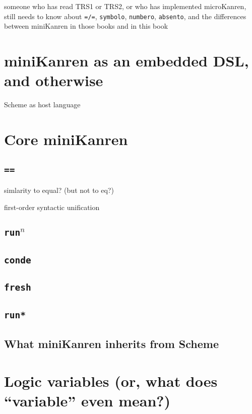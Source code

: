 \documentclass{book}
\begin{document}
someone who has read TRS1 or TRS2, or who has implemented microKanren,
still needs to know about \texttt{=/=}, \texttt{symbolo},
\texttt{numbero}, \texttt{absento}, and the differences between
miniKanren in those books and in this book

\section{miniKanren as an embedded DSL, and otherwise}

Scheme as host language

\section{Core miniKanren}

\subsection{\texttt{==}}

simlarity to equal? (but not to eq?)

first-order syntactic unification

\subsection{\texttt{run}$^{n}$}

\subsection{\texttt{conde}}

\subsection{\texttt{fresh}}

\subsection{\texttt{run*}}

\subsection{What miniKanren inherits from Scheme}

\section{Logic variables (or, what does ``variable'' even mean?)}
\end{document}
